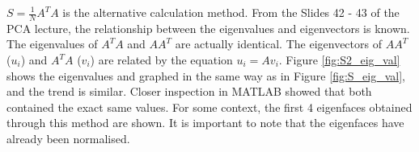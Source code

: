 \documentclass[a4paper, 10pt, conference]{ieeeconf}
\begin{document}
$S = \frac{1}{N}A^{T}A$ is the alternative calculation method. From the Slides 42 - 43 of the PCA lecture\cite{svm}, the relationship between the eigenvalues and eigenvectors is known. The eigenvalues of $A^T A$ and $AA^T$ are actually identical. The eigenvectors of $AA^T$ ($u_i$) and $A^T A$ ($v_i$) are related by the equation $u_i = A v_i$. Figure \ref{fig:S2_eig_val} shows the eigenvalues and graphed in the same way as in Figure \ref{fig:S_eig_val}, and the trend is similar. Closer inspection in MATLAB showed that both contained the exact same values. For some context, the first 4 eigenfaces obtained through this method are shown. It is important to note that the eigenfaces have already been normalised.

\end{document}
